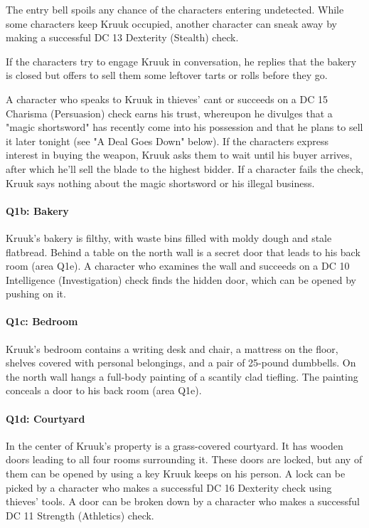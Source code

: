 \documentclass[10pt,a4paper,twoside,bg=print,twocolumn,openany,nodeprecatedcode]{dndbook}
\begin{document}
The entry bell spoils any chance of the characters entering undetected. While some characters keep Kruuk occupied, another character can sneak away by making a successful DC 13 Dexterity (Stealth) check.

If the characters try to engage Kruuk in conversation, he replies that the bakery is closed but offers to sell them some leftover tarts or rolls before they go.

A character who speaks to Kruuk in thieves' cant or succeeds on a DC 15 Charisma (Persuasion) check earns his trust, whereupon he divulges that a "magic shortsword" has recently come into his possession and that he plans to sell it later tonight (see "A Deal Goes Down" below). If the characters express interest in buying the weapon, Kruuk asks them to wait until his buyer arrives, after which he'll sell the blade to the highest bidder. If a character fails the check, Kruuk says nothing about the magic shortsword or his illegal business.



\paragraph{Q1b: Bakery}
Kruuk's bakery is filthy, with waste bins filled with moldy dough and stale flatbread. Behind a table on the north wall is a secret door that leads to his back room (area Q1e). A character who examines the wall and succeeds on a DC 10 Intelligence (Investigation) check finds the hidden door, which can be opened by pushing on it.

\paragraph{Q1c: Bedroom}
Kruuk's bedroom contains a writing desk and chair, a mattress on the floor, shelves covered with personal belongings, and a pair of 25-pound dumbbells. On the north wall hangs a full-body painting of a scantily clad tiefling. The painting conceals a door to his back room (area Q1e).

\paragraph{Q1d: Courtyard}
In the center of Kruuk's property is a grass-covered courtyard. It has wooden doors leading to all four rooms surrounding it. These doors are locked, but any of them can be opened by using a key Kruuk keeps on his person. A lock can be picked by a character who makes a successful DC 16 Dexterity check using thieves' tools. A door can be broken down by a character who makes a successful DC 11 Strength (Athletics) check.
\end{document}
